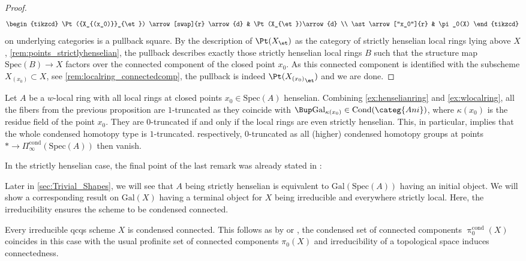 \documentclass[leqno]{article}
\renewcommand{\Gal}{\mathrm{Gal}}
\newcommand{\Ani}{\categ{Ani}}
\DeclareMathOperator{\Cond}{Cond}
\newcommand{\CondAni}{\Cond(\Ani)}
\newcommand{\cond}{\mathrm{cond}}
\newcommand{\Picond}{\Pi_{\infty}^{\cond}}
\newcommand{\CondShape}[1]{\Picond(#1)}
\newcommand{\picond}{\uppi^{\cond}}
\newcommand{\pizerocond}{\picond_0}
\renewcommand{\Spec}{\mathrm{Spec}}
\begin{document}
\begin{proof}
 \[
  \begin{tikzcd}
   \Pt({X_{(x_0)}}_{\et}) \arrow[swap]{r} \arrow{d} & \Pt(X_{\et})\arrow{d} \\
     \ast \arrow["x_0"]{r} & \pi_0(X)
  \end{tikzcd}
    \]
on underlying categories is a pullback square. By the description of $\Pt(X_{\et})$ as the category of strictly henselian local rings lying above $X$, \cref{rem:points_strictlyhenselian}, the pullback describes exactly those strictly henselian local rings $B$ such that the structure map $\Spec(B) \rightarrow X$ factors over the connected component of the closed point $x_0$. As this connected component is identified with the subscheme $X_{(x_0)}\subset X$, see \cref{rem:localring_connectedcomp}, the pullback is indeed $ \Pt({X_{(x_0)}}_{\et})$ and we are done.
\end{proof}
%
\begin{remark}
Let $A$ be a $w$-local ring with all local rings at closed points $x_0\in \Spec(A)$ henselian.
Combining \cref{ex:henselianring} and \cref{ex:wlocalring}, all the fibers from the previous proposition are $1$-truncated as they coincide with $\Bup\Gal_{\kappa(x_0)}\in \CondAni$, where $\kappa(x_0)$ is the residue field of the point $x_0$. They are $0$-truncated if and only if the local rings are even strictly henselian. This, in particular, implies that the whole condensed homotopy type is $1$-truncated. respectively, $0$-truncated as all (higher) condensed homotopy groups at points $\ast \rightarrow \CondShape{\Spec(A)}$ then vanish.
\end{remark}
%
In the strictly henselian case, the final point of the last remark was already stated in \cite{The_condensed_homotopy_type}:
%
%
Later in \cref{sec:Trivial_Shapes}, we will see that $A$ being strictly henselian is equivalent to $\Gal(\Spec(A))$ having an initial object. We will show a corresponding result on $\Gal(X)$ having a terminal object for $X$ being irreducible and everywhere strictly local. Here, the irreducibility ensures the scheme to be condensed connected.
%
\begin{example}
Every irreducible qcqs scheme $X$ is condensed connected. This follows as by \cite[Corollary 4.19]{The_condensed_homotopy_type} or \cite[Proposition 2.2.25]{CatrinsThesis}, the condensed set of connected components $\pizerocond(X)$ coincides in this case with the usual profinite set of connected components $\pi_0(X)$ and irreducibility of a topological space induces connectedness.
\end{example}
\end{document}
